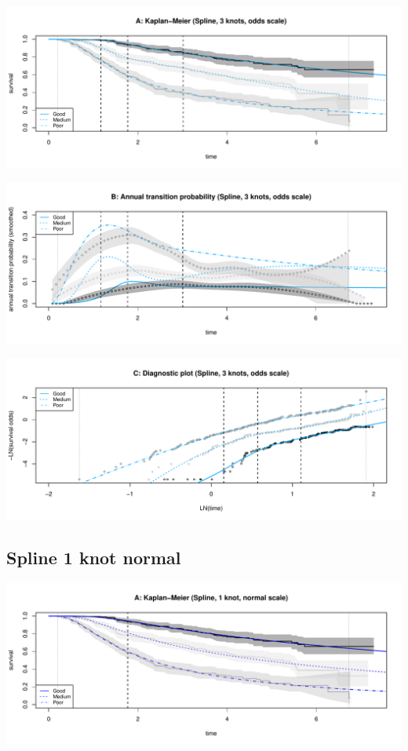 \documentclass[]{article}
\begin{document}
\begin{flushleft}\includegraphics[height=0.25\textheight]{Images/spline_odds3-1} \end{flushleft}

\begin{flushleft}\includegraphics[height=0.25\textheight]{Images/spline_odds3-2} \end{flushleft}

\begin{flushleft}\includegraphics[height=0.25\textheight]{Images/spline_odds3-3} \end{flushleft}

\newpage

\subsection{Spline 1 knot normal}\label{spline-1-knot-normal}

\begin{flushleft}\includegraphics[height=0.25\textheight]{Images/spline_norm1-1} \end{flushleft}
\end{document}
